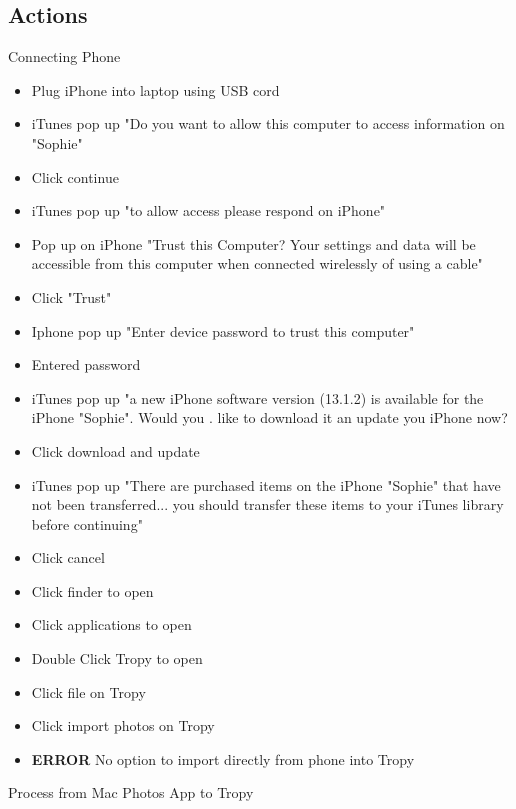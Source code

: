 \documentclass{article}
\begin{document}
\subsection{Actions}
Connecting Phone
\begin{itemize}
\item Plug iPhone into laptop using USB cord
\item iTunes pop up "Do you want to allow this computer to access information on "Sophie"
\item Click continue
\item iTunes pop up "to allow access please respond on iPhone"
\item Pop up on iPhone "Trust this Computer? Your settings and data will be accessible from this computer when connected wirelessly of using a cable"
\item Click "Trust"
\item Iphone pop up "Enter device password to trust this computer"
\item Entered password
\item iTunes pop up "a new iPhone software version (13.1.2) is available for the iPhone "Sophie". Would you . like to download it an update you iPhone now?
\item Click download and update
\item iTunes pop up "There are purchased items on the iPhone "Sophie" that have not been transferred... you should transfer these items to your iTunes library before continuing"
\item Click cancel
\item Click finder to open
\item Click applications to open
\item Double Click Tropy to open
\item Click file on Tropy
\item Click import photos on Tropy
\item \textbf{ERROR} No option to import directly from phone into Tropy
\end{itemize}
Process from Mac Photos App to Tropy
\end{document}
